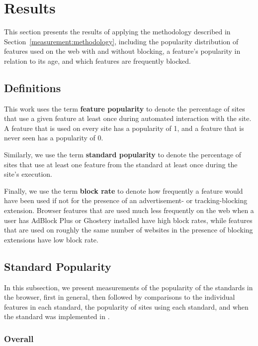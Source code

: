 \section{Results} \label{measuement:results}

This section presents the results of applying the methodology described in
Section~\ref{measurement:methodology}, including the popularity distribution of
\JS features used on the web with and without blocking, a feature's popularity
in relation to its age, and which features are frequently blocked.


\subsection{Definitions} This work uses the term \textbf{feature popularity} to
denote the percentage of sites that use a given feature at least once during
automated interaction with the site.  A feature that is used on every site has
a popularity of 1, and a feature that is never seen has a popularity of 0.

Similarly, we use the term \textbf{standard popularity} to denote the
percentage of sites that use at least one feature from the standard at least
once during the site's execution.

Finally, we use the term \textbf{block rate} to denote how frequently a feature
would have been used if not for the presence of an advertisement- or
tracking-blocking extension. Browser features that are used much less
frequently on the web when a user has AdBlock Plus or Ghostery installed have
high block rates, while features that are used on roughly the same number of
websites in the presence of blocking extensions have low block rate.


\subsection{Standard Popularity} In this subsection, we present measurements of
the popularity of the standards in the browser, first in general, then followed
by comparisons to the individual features in each standard, the popularity of
sites using each standard, and when the standard was implemented in \FF.


\subsubsection{Overall}



